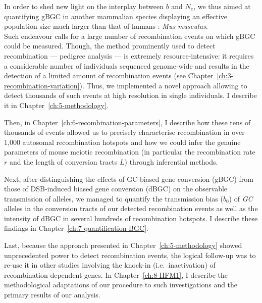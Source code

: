 
In order to shed new light on the interplay between $b$ and $N_e$, we thus aimed at quantifying gBGC in another mammalian species displaying an effective population size much larger than that of humans \citep{geraldes2008inferring,phifer-rixey2012adaptive,davies2015factors}: \textit{Mus musculus}.\\

Such endeavour calls for a large number of recombination events on which gBGC could be measured. 
Though, the method prominently used to detect recombination — pedigree analysis — is extremely resource-intensive: it requires a considerable number of individuals sequenced genome-wide and results in the detection of a limited amount of recombination events (see Chapter~\ref{ch:3-recombination-variation}).
Thus, we implemented a novel approach allowing to detect thousands of such events at high resolution in single individuals. I describe it in Chapter~\ref{ch:5-methodology}.

Then, in Chapter~\ref{ch:6-recombination-parameters}, I describe how these tens of thousands of events allowed us to precisely characterise recombination in over 1,000 autosomal recombination hotspots and how we could infer the genuine parameters of mouse meiotic recombination (in particular the recombination rate $r$ and the length of conversion tracts $L$) through inferential methods.

Next, after distinguishing the effects of GC-biased gene conversion (gBGC) from those of DSB-induced biased gene conversion (dBGC) on the observable transmission of alleles, we managed to quantify the transmission bias ($b_0$) of \textit{GC} alleles in the conversion tracts of our detected recombination events as well as the intensity of dBGC in several hundreds of recombination hotspots. 
I describe these findings in Chapter~\ref{ch:7-quantification-BGC}.

Last, because the approach presented in Chapter~\ref{ch:5-methodology} showed unprecedented power to detect recombination events, the logical follow-up was to re-use it in other studies involving the knock-in (i.e.\ inactivation) of recombination-dependent genes.
In Chapter~\ref{ch:8-HFM1}, I describe the methodological adaptations of our procedure to such investigations and the primary results of our analysis.

